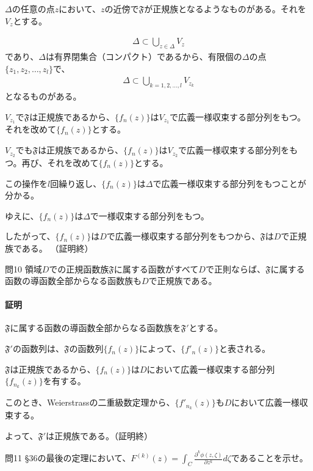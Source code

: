 $\Delta$の任意の点$z$において、$z$の近傍で$\mathfrak{F}$が正規族となるようなものがある。それを$V_z$とする。

\begin{align*}
    \Delta\subset\bigcup_{z\in\Delta}V_z
\end{align*}
であり、$\Delta$は有界閉集合（コンパクト）であるから、有限個の$\Delta$の点$\{z_1,z_2,\dots,z_l\}$で、
\begin{align*}
    \Delta\subset\bigcup_{k=1,2,\dots,l}V_{z_k}
\end{align*}
となるものがある。

$V_{z_1}$で$\mathfrak{F}$は正規族であるから、$\{f_n(z)\}$は$V_{z_1}$で広義一様収束する部分列をもつ。それを改めて$\{f_n(z)\}$とする。

$V_{z_2}$でも$\mathfrak{F}$は正規族であるから、$\{f_n(z)\}$は$V_{z_2}$で広義一様収束する部分列をもつ。再び、それを改めて$\{f_n(z)\}$とする。

この操作を$l$回繰り返し、$\{f_n(z)\}$は$\Delta$で広義一様収束する部分列をもつことが分かる。

ゆえに、$\{f_n(z)\}$は$\Delta$で一様収束する部分列をもつ。

したがって、$\{f_n(z)\}$は$D$で広義一様収束する部分列をもつから、$\mathfrak{F}$は$D$で正規族である。
（証明終）






\begin{mysimplebox}{問10}
    領域$D$での正規函数族$\mathfrak{F}$に属する函数がすべて$D$で正則ならば、$\mathfrak{F}$に属する函数の導函数全部からなる函数族も$D$で正規族である。
\end{mysimplebox}
\paragraph{証明}
$\mathfrak{F}$に属する函数の導函数全部からなる函数族を$\mathfrak{F'}$とする。

$\mathfrak{F'}$の函数列は、$\mathfrak{F}$の函数列$\{f_n(z)\}$によって、$\{f'_n(z)\}$と表される。

$\mathfrak{F}$は正規族であるから、$\{f_n(z)\}$は$D$において広義一様収束する部分列$\{f_{n_k}(z)\}$を有する。

このとき、Weierstrassの二重級数定理から、$\{f'_{n_k}(z)\}$も$D$において広義一様収束する。

よって、$\mathfrak{F'}$は正規族である。（証明終）

\begin{mysimplebox}{問11}
    §36の最後の定理において、$F^{(k)}(z)=\int_{C}\frac{\partial^k\phi(z,\zeta)}{\partial z^k}d\zeta$であることを示せ。
\end{mysimplebox}

